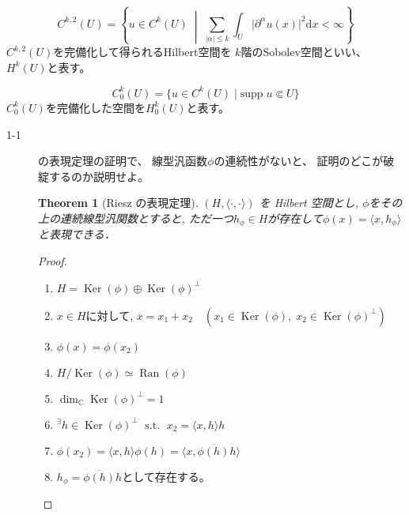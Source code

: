 \documentclass[12pt,b5paper]{ltjsarticle}
\newtheorem{theo}{Theorem}
\newcommand{\Ker}{\mathop{\mathrm{Ker}}\nolimits}
\newcommand{\Ran}{\mathop{\mathrm{Ran}}\nolimits}
\begin{document}
\begin{equation}
 C^{k,2}(U) = \left\{ u\in C^{k}(U) \; \middle| \; \sum_{\lvert \alpha \rvert\leq k}\int_{U}\lvert \partial^{\alpha}u(x) \rvert^{2}\mathrm{d}x < \infty \right\}
\end{equation}
$C^{k,2}(U)$を完備化して得られるHilbert空間を
$k$階のSobolev空間といい、$H^{k}(U)$と表す。

\begin{equation}
 C_{0}^{k}(U) = \{ u\in C^{k}(U) \mid \mathrm{supp}\; u \Subset U\}
\end{equation}
$C_{0}^{k}(U)$を完備化した空間を$H_{0}^{k}(U)$と表す。



\hrulefill


\begin{description}
 \item[1-1]
             の表現定理の証明で、
            線型汎函数$\phi$の連続性がないと、
            証明のどこが破綻するのか説明せよ。

            \begin{theo}[Riesz の表現定理]
             $(H,\langle\cdot,\cdot\rangle)$ を Hilbert 空間とし,
             $\phi$をその上の連続線型汎関数とすると,
             ただ一つ$h_{\phi}\in H$が存在して$\phi(x)=\langle x,h_{\phi}\rangle$と表現できる．
            \end{theo}

            \begin{proof}
            \begin{enumerate}
             \item $H = \Ker(\phi) \oplus \Ker(\phi)^{\perp}$
             \item $x\in H$に対して, \; $x=x_{1}+x_{2} \quad (x_{1}\in\Ker(\phi) , \; x_{2}\in\Ker(\phi)^{\perp})$
             \item $\phi(x)=\phi(x_{2})$
             \item $H/\Ker(\phi) \simeq \Ran(\phi)$
             \item $\dim_{\mathbb{C}}\Ker(\phi)^{\perp} = 1$
             \item ${}^\exists h\in\Ker(\phi)^{\perp} \; \text{ s.t. } \; x_{2}=\langle x,h \rangle h$
             \item $\phi(x_{2}) = \langle x,h \rangle \phi(h) = \langle x, \overline{\phi(h)} h \rangle$
             \item $h_{\phi} = \overline{\phi(h)} h$として存在する。
            \end{enumerate}


\end{proof}
\end{description}
\end{document}
